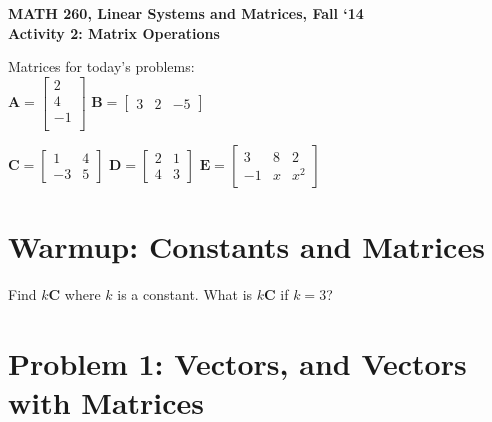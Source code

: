 \documentclass{article}
\begin{document}
\begin{flushleft}
	\bfseries{MATH 260, Linear Systems and Matrices, Fall `14}\\
	\bfseries{Activity 2:  Matrix Operations}\\
\end{flushleft}
\begin{flushleft}
\vspace{.25in}

Matrices for today's problems:\\

$\textbf{A}=\left[
\begin{array}{c}
	2\\
	4\\
	-1\\
\end{array}
\right]
$
\hspace{.1in}
$\textbf{B}=\left[
\begin{array}{ccc}
3 & 2 & -5
\end{array}\right]$
\hspace{.1in}

$\textbf{C}=\left[
\begin{array}{cc}
1 & 4\\
-3 & 5
\end{array}
\right]
$
\hspace{.1in}
$\textbf{D}=\left[
\begin{array}{cc}
2 & 1\\
4 & 3
\end{array}
\right]$
\hspace{.1in}
$\textbf{E}=\left[
\begin{array}{ccc}
3 & 8 & 2\\
-1 & x & x^2
\end{array}
\right]
$

\section*{Warmup: Constants and Matrices}

Find $k\textbf{C}$ where $k$ is a constant. What is $k\textbf{C}$ if $k=3$?

\vspace{2in}

\section*{Problem 1:  Vectors, and Vectors with Matrices}


\end{flushleft}
\end{document}
